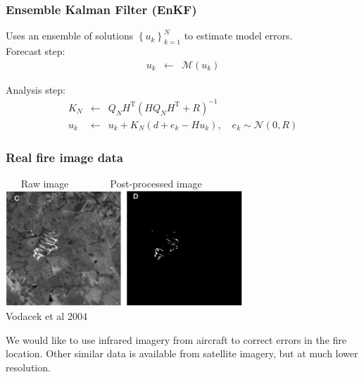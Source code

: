 \documentclass{beamer}
\begin{document}
\begin{frame}%
  
  \frametitle{Ensemble Kalman Filter (EnKF)}
  Uses an ensemble of solutions $\left\{u_k\right\}_{k=1}^N$ to estimate model errors.\\
  \vspace{.5cm}
  Forecast step:
\begin{eqnarray*}
u_k &\leftarrow & \mathcal{M}(u_k)
\end{eqnarray*}

Analysis step:
  \begin{eqnarray*}
K_N & \leftarrow & Q_N H^{\mathrm{T}}\left(  HQ_N H^{\mathrm{T}}+R\right)
^{-1}\\
u_k&\leftarrow &u_k+ K_N \left(  d+e_k-H u_k\right), \quad e_k\sim\mathcal{N}(0,R)
\end{eqnarray*}

\end{frame}

\begin{frame}
\frametitle{Real fire image data}

\begin{center}
$\quad ~$ Raw image$~\qquad\qquad$Post-processed image\\
\includegraphics[width=3.5in]{eps/vodacek.png}\\
{\footnotesize Vodacek et al 2004}
\end{center}

We would like to use infrared imagery from aircraft to correct errors in the fire location.  Other
similar data is available from satellite imagery, but at much lower resolution.
\end{frame}
\end{document}
